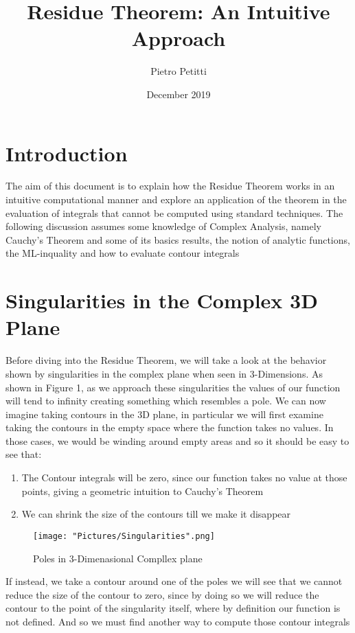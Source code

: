 \documentclass[12pt, letterpaper]{article}
\title{Residue Theorem: An Intuitive Approach }
\author{Pietro Petitti}
\date{December 2019}
\begin{document}
\maketitle

\section*{Introduction}

The aim of this document is to explain how the Residue Theorem works in an intuitive computational manner and explore an application of the theorem in the evaluation of integrals that cannot be computed using standard techniques. The following discussion assumes some knowledge of Complex Analysis, namely Cauchy's Theorem and some of its basics results, the notion of analytic functions, the ML-inquality and how to evaluate contour integrals
\bigskip

\section*{Singularities in the Complex 3D Plane}

Before diving into the Residue Theorem, we will take a look at the behavior shown by singularities in the complex plane when seen in 3-Dimensions. As shown in Figure 1, as we approach these singularities the values of our function will tend to infinity creating something which resembles a pole. We can now imagine taking contours in the 3D plane, in particular we will first examine taking the contours in the empty space where the function takes no values. In those cases, we would be winding around empty areas and so it should be easy to see that:

\begin{enumerate}
  \item The Contour integrals will be zero, since our function takes no value at those points, giving a geometric intuition to Cauchy's Theorem
  \item We can shrink the size of the contours till we make it disappear 
\end{enumerate}

\begin{figure}[h]
    \centering
    \texttt{[image: "Pictures/Singularities".png]}
    \caption{Poles in 3-Dimenasional Compllex plane}
    \label{fig:my_label1}
\end{figure}

\noindent
If instead, we take a contour around one of the poles we will see that we cannot reduce the size of the contour to zero, since by doing so we will reduce the contour to the point of the singularity itself, where by definition our function is not defined. And so we must find another way to compute those contour integrals
\end{document}
